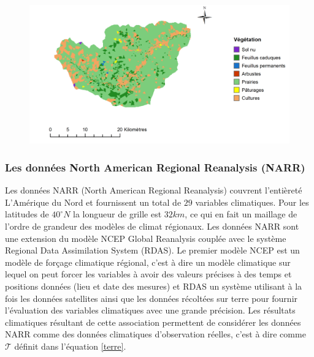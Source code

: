 \documentclass[a4paper,11pt]{article}
\numberwithin{equation}{section}
\begin{document}
\begin{figure}[H]
	\begin{center}
		\includegraphics[scale=0.3]{vegetation_little_Washita.png}
	\end{center}
	\label{fig-little-washita-vegetation}
\end{figure}

\subsubsection{Les données North American Regional Reanalysis (NARR)}
\label{ch:NARR}

Les données NARR (North American Regional Reanalysis) couvrent l'entièreté L'Amérique du Nord et fournissent un total de $29$ variables climatiques. Pour les latitudes de $40^{\circ} N$ la longueur de grille est $32km$, ce qui en fait un maillage de l'ordre de grandeur des modèles de climat régionaux. Les données NARR sont une extension du modèle NCEP Global Reanalysis couplée avec le système Regional Data Assimilation System (RDAS). Le premier modèle NCEP est un modèle de forçage climatique régional, c'est à dire un modèle climatique sur lequel on peut forcer les variables à avoir des valeurs précises à des temps et positions données (lieu et date des mesures) et RDAS un système utilisant à la fois les données satellites ainsi que les données récoltées sur terre pour fournir l'évaluation des variables climatiques avec une grande précision. Les résultats climatiques résultant de cette association permettent de considérer les données NARR comme des données climatiques d'observation réelles, c'est à dire comme $\mathcal{T}$ définit dans l'équation \eqref{terre}. 
\end{document}
